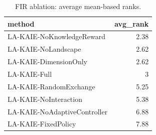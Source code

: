 \begin{table}[t]
\centering
\scriptsize
\caption{FIR ablation: average mean-based ranks.}
\label{tab:fir_ablation_ranks}
\begin{tabular}{lr}
\toprule
method & avg\_rank \\
\midrule
LA-KAIE-NoKnowledgeReward & 2.38 \\
LA-KAIE-NoLandscape & 2.62 \\
LA-KAIE-DimensionOnly & 2.62 \\
LA-KAIE-Full & 3 \\
LA-KAIE-RandomExchange & 5.25 \\
LA-KAIE-NoInteraction & 5.38 \\
LA-KAIE-NoAdaptiveController & 6.88 \\
LA-KAIE-FixedPolicy & 7.88 \\
\bottomrule
\end{tabular}
\end{table}
